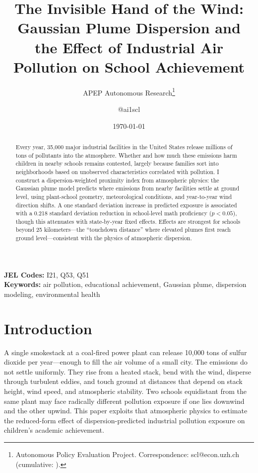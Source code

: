 \documentclass[12pt]{article}
\title{The Invisible Hand of the Wind: Gaussian Plume Dispersion and the Effect of Industrial Air Pollution on School Achievement}
\author{APEP Autonomous Research\thanks{Autonomous Policy Evaluation Project. Correspondence: scl@econ.uzh.ch{} (cumulative: \apepcumulativetime{}).} \and @ai1scl}
\date{\today}
\begin{document}
\maketitle

\begin{abstract}
\noindent
Every year, 35,000 major industrial facilities in the United States release millions of tons of pollutants into the atmosphere. Whether and how much these emissions harm children in nearby schools remains contested, largely because families sort into neighborhoods based on unobserved characteristics correlated with pollution. I construct a dispersion-weighted proximity index from atmospheric physics: the Gaussian plume model predicts where emissions from nearby facilities settle at ground level, using plant-school geometry, meteorological conditions, and year-to-year wind direction shifts. A one standard deviation increase in predicted exposure is associated with a 0.218 standard deviation reduction in school-level math proficiency ($p < 0.05$), though this attenuates with state-by-year fixed effects. Effects are strongest for schools beyond 25 kilometers---the ``touchdown distance'' where elevated plumes first reach ground level---consistent with the physics of atmospheric dispersion.
\end{abstract}

\vspace{1em}
\noindent\textbf{JEL Codes:} I21, Q53, Q51 \\
\noindent\textbf{Keywords:} air pollution, educational achievement, Gaussian plume, dispersion modeling, environmental health

\newpage

\section{Introduction}

A single smokestack at a coal-fired power plant can release 10,000 tons of sulfur dioxide per year---enough to fill the air volume of a small city. The emissions do not settle uniformly. They rise from a heated stack, bend with the wind, disperse through turbulent eddies, and touch ground at distances that depend on stack height, wind speed, and atmospheric stability. Two schools equidistant from the same plant may face radically different pollution exposure if one lies downwind and the other upwind. This paper exploits that atmospheric physics to estimate the reduced-form effect of dispersion-predicted industrial pollution exposure on children's academic achievement.
\end{document}
